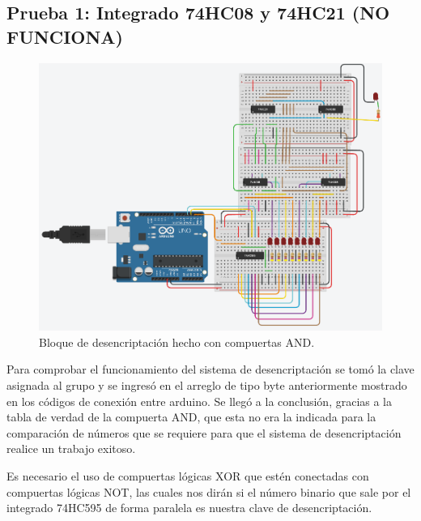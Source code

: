\documentclass{article}
\begin{document}
\subsection{Prueba 1: Integrado 74HC08 y 74HC21 (NO FUNCIONA)}

\begin{figure}[h]
\includegraphics[scale=0.6]{74HC08.png}
\centering
\caption{Bloque de desencriptación hecho con compuertas AND.}
\label{fig:74HC08}
\end{figure}

Para comprobar el funcionamiento del sistema de desencriptación se tomó la clave asignada al grupo y se ingresó en el arreglo de tipo byte anteriormente mostrado en los códigos de conexión entre arduino. 
Se llegó a la conclusión, gracias a la tabla de verdad de la compuerta AND, que esta no era la indicada para la comparación de números que se requiere para que el sistema de desencriptación realice un trabajo exitoso.

Es necesario el uso de compuertas lógicas XOR que estén conectadas con compuertas lógicas NOT, las cuales nos dirán si el número binario que sale por el integrado 74HC595 de forma paralela es nuestra clave de desencriptación.
\newpage
\end{document}
